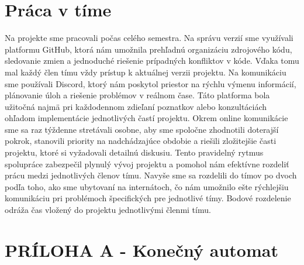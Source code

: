 \documentclass[Slovak, a4paper, 12pt]{article}
\begin{document}
	\section{Práca v tíme}
	Na projekte sme pracovali počas celého semestra. Na správu verzií sme využívali platformu GitHub, ktorá nám umožnila prehľadnú organizáciu zdrojového kódu, sledovanie zmien a jednoduché riešenie prípadných konfliktov v kóde. Vďaka tomu mal každý člen tímu vždy prístup k aktuálnej verzii projektu. Na komunikáciu sme používali Discord, ktorý nám poskytol priestor na rýchlu výmenu informácií, plánovanie úloh a riešenie problémov v reálnom čase. Táto platforma bola užitočná najmä pri každodennom zdieľaní poznatkov alebo konzultáciách ohľadom implementácie jednotlivých častí projektu. Okrem online komunikácie sme sa raz týždenne stretávali osobne, aby sme spoločne zhodnotili doterajší pokrok, stanovili priority na nadchádzajúce obdobie a riešili zložitejšie časti projektu, ktoré si vyžadovali detailnú diskusiu. Tento pravidelný rytmus spolupráce zabezpečil plynulý vývoj projektu a pomohol nám efektívne rozdeliť prácu medzi jednotlivých členov tímu. Navyše sme sa rozdelili do tímov po dvoch podľa toho, ako sme ubytovaní na internátoch, čo nám umožnilo ešte rýchlejšiu komunikáciu pri problémoch špecifických pre jednotlivé tímy. Bodové rozdelenie odráža  čas vložený do projektu jednotlivými členmi tímu.
	
	\newpage
	\section{PRÍLOHA A - Konečný automat}
	\begin{figure}[ht]
		\begin{center}
		\end{center}
	\end{figure}
	
\end{document}
